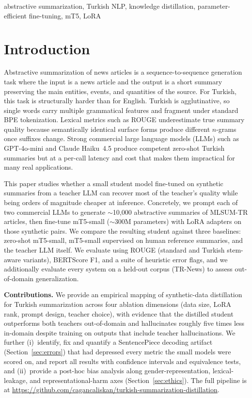 \documentclass[conference]{IEEEtran}
\begin{document}
\begin{IEEEkeywords}
abstractive summarization, Turkish NLP, knowledge distillation, parameter-efficient fine-tuning, mT5, LoRA
\end{IEEEkeywords}

\section{Introduction}
Abstractive summarization of news articles is a sequence-to-sequence generation task where the input is a news article and the output is a short summary preserving the main entities, events, and quantities of the source. For Turkish, this task is structurally harder than for English. Turkish is agglutinative, so single words carry multiple grammatical features and fragment under standard BPE tokenization. Lexical metrics such as ROUGE underestimate true summary quality because semantically identical surface forms produce different $n$-grams once suffixes change. Strong commercial large language models (LLMs) such as GPT-4o-mini and Claude Haiku~4.5 produce competent zero-shot Turkish summaries but at a per-call latency and cost that makes them impractical for many real applications.

This paper studies whether a small student model fine-tuned on synthetic summaries from a teacher LLM can recover most of the teacher's quality while being orders of magnitude cheaper at inference. Concretely, we prompt each of two commercial LLMs to generate $\sim$10{,}000 abstractive summaries of MLSUM-TR articles, then fine-tune mT5-small ($\sim$300M parameters) with LoRA adapters on those synthetic pairs. We compare the resulting student against three baselines: zero-shot mT5-small, mT5-small supervised on human reference summaries, and the teacher LLM itself. We evaluate using ROUGE (standard and Turkish stem-aware variants), BERTScore F1, and a suite of heuristic error flags, and we additionally evaluate every system on a held-out corpus (TR-News) to assess out-of-domain generalization.

\textbf{Contributions.} We provide an empirical mapping of synthetic-data distillation for Turkish summarization across four ablation dimensions (data size, LoRA rank, prompt design, teacher choice), with evidence that the distilled student outperforms both teachers out-of-domain and hallucinates roughly five times less in-domain despite training on outputs that include teacher hallucinations. We further (i)~identify, fix and quantify a SentencePiece decoding artifact (Section~\ref{sec:errors}) that had depressed every metric the small models were scored on, and report all results with confidence intervals and equivalence tests, and (ii)~provide a post-hoc bias analysis along gender-representation, lexical-leakage, and representational-harm axes (Section~\ref{sec:ethics}). The full pipeline is at \url{https://github.com/cagancaliskan/turkish-summarization-distillation}.
\end{document}
